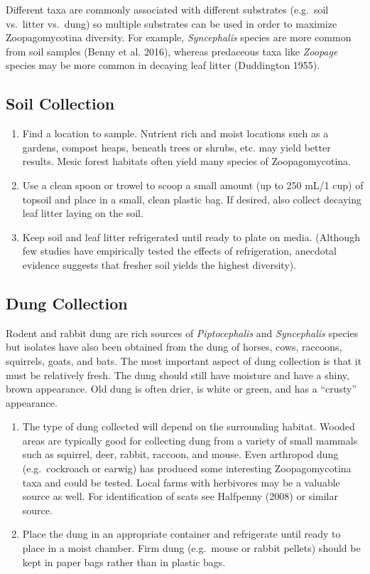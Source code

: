 \documentclass[]{book}
\begin{document}
Different taxa are commonly associated with different substrates
(e.g.~soil vs.~litter vs.~dung) so multiple substrates can be used in
order to maximize Zoopagomycotina diversity. For example,
\emph{Syncephalis} species are more common from soil samples (Benny et
al. 2016), whereas predaceous taxa like \emph{Zoopage} species may be
more common in decaying leaf litter (Duddington 1955).

\subsection{Soil Collection}\label{soil-collection}

\begin{enumerate}
\def\labelenumi{\arabic{enumi}.}
\item
  Find a location to sample. Nutrient rich and moist locations such as a
  gardens, compost heaps, beneath trees or shrubs, etc. may yield better
  results. Mesic forest habitats often yield many species of
  Zoopagomycotina.
\item
  Use a clean spoon or trowel to scoop a small amount (up to 250 mL/1
  cup) of topsoil and place in a small, clean plastic bag. If desired,
  also collect decaying leaf litter laying on the soil.
\item
  Keep soil and leaf litter refrigerated until ready to plate on media.
  (Although few studies have empirically tested the effects of
  refrigeration, anecdotal evidence suggests that fresher soil yields
  the highest diversity).
\end{enumerate}

\subsection{Dung Collection}\label{dung-collection}

Rodent and rabbit dung are rich sources of \emph{Piptocephalis} and
\emph{Syncephalis} species but isolates have also been obtained from the
dung of horses, cows, raccoons, squirrels, goats, and bats. The most
important aspect of dung collection is that it must be relatively fresh.
The dung should still have moisture and have a shiny, brown appearance.
Old dung is often drier, is white or green, and has a ``crusty''
appearance.

\begin{enumerate}
\def\labelenumi{\arabic{enumi}.}
\item
  The type of dung collected will depend on the surrounding habitat.
  Wooded areas are typically good for collecting dung from a variety of
  small mammals such as squirrel, deer, rabbit, raccoon, and mouse. Even
  arthropod dung (e.g.~cockroach or earwig) has produced some
  interesting Zoopagomycotina taxa and could be tested. Local farms with
  herbivores may be a valuable source as well. For identification of
  scats see Halfpenny (2008) or similar source.
\item
  Place the dung in an appropriate container and refrigerate until ready
  to place in a moist chamber. Firm dung (e.g.~mouse or rabbit pellets)
  should be kept in paper bags rather than in plastic bags.
\end{enumerate}
\end{document}
